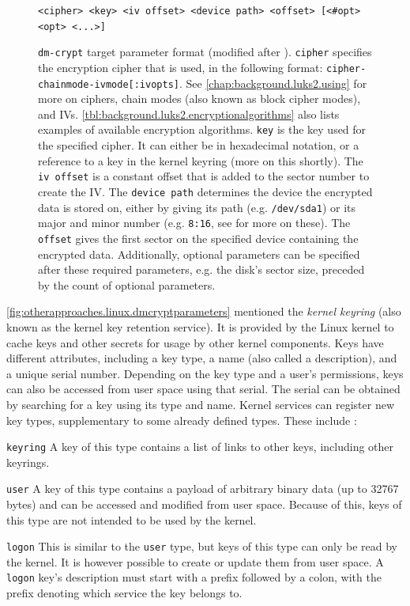 \begin{figure}[htb!]
	\center
	\begin{mdframed}
		\texttt{<cipher> <key> <iv offset> <device path> <offset> [<\#opt> <opt> <...>]}
	\end{mdframed}
	\caption[
		\texttt{dm-crypt} target parameter format
	]{
		\texttt{dm-crypt} target parameter format (modified after \cite{Dmcrypt2020}). \texttt{cipher} specifies the encryption cipher that is used, in the following format: \texttt{cipher-chainmode-ivmode[:ivopts]}. See \autoref{chap:background.luks2.using} for more on ciphers, chain modes (also known as block cipher modes), and IVs. \autoref{tbl:background.luks2.encryptionalgorithms} also lists examples of available encryption algorithms. \texttt{key} is the key used for the specified cipher. It can either be in hexadecimal notation, or a reference to a key in the kernel keyring (more on this shortly). The \texttt{iv offset} is a constant offset that is added to the sector number to create the IV. The \texttt{device path} determines the device the encrypted data is stored on, either by giving its path (e.g. \texttt{/dev/sda1}) or its major and minor number (e.g. \texttt{8:16}, see \cite{Corbet2005} for more on these). The \texttt{offset} gives the first sector on the specified device containing the encrypted data. Additionally, optional parameters can be specified after these required parameters, e.g. the disk's sector size, preceded by the count of optional parameters.
	}
	\label{fig:otherapproaches.linux.dmcryptparameters}
\end{figure}

\autoref{fig:otherapproaches.linux.dmcryptparameters} mentioned the \emph{kernel keyring} (also known as the kernel key retention service). It is provided by the Linux kernel to cache keys and other secrets for usage by other kernel components. Keys have different attributes, including a key type, a name (also called a description), and a unique serial number. Depending on the key type and a user's permissions, keys can also be accessed from user space using that serial. The serial can be obtained by searching for a key using its type and name. Kernel services can register new key types, supplementary to some already defined types. These include \cite{Linux}\cite{ManKeyrings}:
\begin{descitemize}
	\item[\texttt{keyring}] A key of this type contains a list of links to other keys, including other keyrings.
	\item[\texttt{user}] A key of this type contains a payload of arbitrary binary data (up to 32767 bytes) and can be accessed and modified from user space. Because of this, keys of this type are not intended to be used by the kernel.
	\item[\texttt{logon}] This is similar to the \texttt{user} type, but keys of this type can only be read by the kernel. It is however possible to create or update them from user space. A \texttt{logon} key's description must start with a prefix followed by a colon, with the prefix denoting which service the key belongs to.
\end{descitemize}

